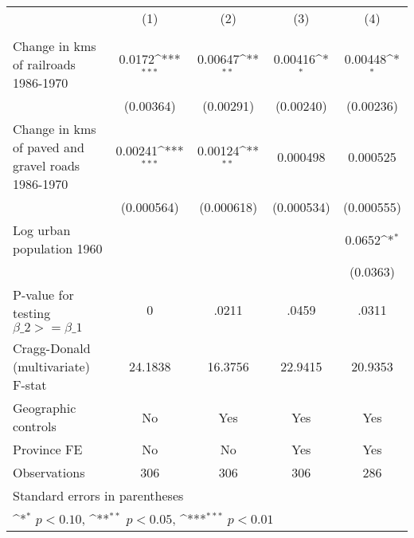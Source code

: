 {
\def\sym#1{\ifmmode^{#1}\else\(^{#1}\)\fi}
\begin{tabular}{l*{4}{c}}
\hline\hline
                &\multicolumn{1}{c}{(1)}&\multicolumn{1}{c}{(2)}&\multicolumn{1}{c}{(3)}&\multicolumn{1}{c}{(4)}\\
                &\multicolumn{1}{c}{}&\multicolumn{1}{c}{}&\multicolumn{1}{c}{}&\multicolumn{1}{c}{}\\
\hline
Change in kms of railroads 1986-1970&   0.0172\sym{***}&  0.00647\sym{**} &  0.00416\sym{*}  &  0.00448\sym{*}  \\
                &(0.00364)         &(0.00291)         &(0.00240)         &(0.00236)         \\
[1em]
Change in kms of paved and gravel roads 1986-1970&  0.00241\sym{***}&  0.00124\sym{**} & 0.000498         & 0.000525         \\
                &(0.000564)         &(0.000618)         &(0.000534)         &(0.000555)         \\
[1em]
Log urban population 1960&                  &                  &                  &   0.0652\sym{*}  \\
                &                  &                  &                  & (0.0363)         \\
\hline
P-value for testing $\beta\_{2} >= \beta\_{1}$&        0         &    .0211         &    .0459         &    .0311         \\
Cragg-Donald (multivariate) F-stat&  24.1838         &  16.3756         &  22.9415         &  20.9353         \\
Geographic controls&       No         &      Yes         &      Yes         &      Yes         \\
Province FE     &       No         &       No         &      Yes         &      Yes         \\
Observations    &      306         &      306         &      306         &      286         \\
\hline\hline
\multicolumn{5}{l}{\footnotesize Standard errors in parentheses}\\
\multicolumn{5}{l}{\footnotesize \sym{*} \(p<0.10\), \sym{**} \(p<0.05\), \sym{***} \(p<0.01\)}\\
\end{tabular}
}
